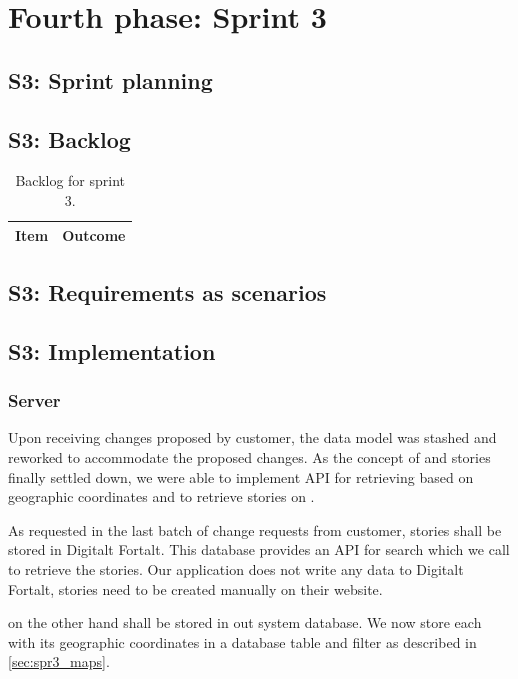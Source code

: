 \documentclass[11pt]{book}
\begin{document}
\section{Fourth phase: Sprint 3}
\subsection{S3: Sprint planning}
\subsection{S3: Backlog}
\begin{table}[H]
    \centering
    \begin{tabular}{| l | l |} \hline
        Item                                                                & Outcome         \\ \hline

    \end{tabular}
    \caption{Backlog for sprint 3.}
    \label{tab:phase_sprint3_backlog}
\end{table}

\subsection{S3: Requirements as scenarios}

\subsection{S3: Implementation}

\subsubsection{Server}

Upon receiving changes proposed by customer, the data model was stashed and reworked to accommodate the proposed changes. As the concept of \wallentityp and stories finally settled down, we were able to implement API for retrieving \wallentityp based on geographic coordinates and to retrieve stories on \wallentityp.

As requested in the last batch of change requests from customer, stories shall be stored in Digitalt Fortalt. This database provides an API for search which we call to retrieve the stories. Our application does not write any data to Digitalt Fortalt, stories need to be created manually on their website.

\wallentitypcap on the other hand shall be stored in out system database. We now store each \wallentitys with its geographic coordinates in a database table and filter as described in \ref{sec:spr3_maps}. 
\end{document}
